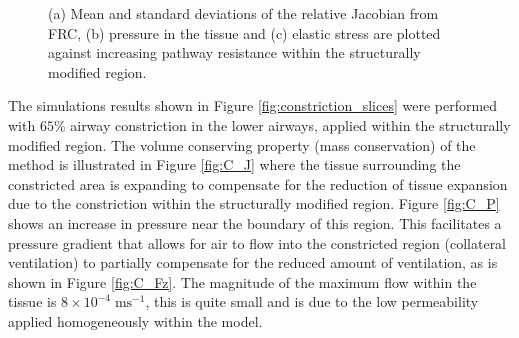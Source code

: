 \begin{figure}[h]
  \centering
    \hspace*{0.1cm}
   \hspace*{0.1cm}
\caption{(a) Mean and standard deviations of the relative Jacobian from FRC, (b) pressure in the tissue and (c) elastic stress are plotted against increasing pathway resistance within the structurally modified region.}
  \label{fig:constrict_errorbars}
\end{figure}
%
%
The simulations results shown in Figure \ref{fig:constriction_slices} were performed with $65\%$ airway constriction in the lower airways, applied within the structurally modified region. The volume conserving property (mass conservation) of the method is illustrated in Figure \ref{fig:C_J} where the tissue surrounding the constricted area is expanding to compensate for the reduction of tissue expansion due to the constriction within the structurally modified region. Figure \ref{fig:C_P} shows an increase in pressure near the boundary of this region. This facilitates a pressure gradient that allows for air to flow into the constricted region (collateral ventilation) to partially compensate for the reduced amount of ventilation, as is shown in Figure \ref{fig:C_Fz}. The magnitude of the maximum flow within the tissue is $8 \times 10^{-4} \;\mbox{m}\mbox{s}^{-1}$, this is quite small and is due to the low permeability applied homogeneously within the model.
